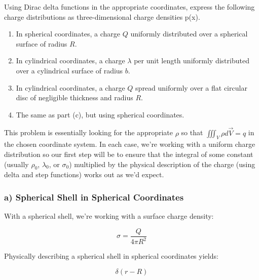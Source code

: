 \begin{question}
  Using Dirac delta functions in the appropriate coordinates, express
  the following charge distributions as three-dimensional charge
  densities p(x).

  \begin{enumerate}[label=(\alph*)]

    \item In spherical coordinates, a charge $Q$ uniformly distributed
      over a spherical surface of radius $R$.

    \item In cylindrical coordinates, a charge $\lambda$ per unit
      length uniformly distributed over a cylindrical surface of
      radius $b$.

    \item In cylindrical coordinates, a charge $Q$ spread uniformly
      over a flat circular disc of negligible thickness and radius
      $R$.

    \item The same as part (c), but using spherical coordinates.
  \end{enumerate}

\end{question}


This problem is essentially looking for the appropriate $\rho$ so that
$\iiint_V \rho d\vec{V} = q$ in the chosen coordinate system.  In each
case, we're working with a uniform charge distribution so our first
step will be to ensure that the integral of some constant (usually
$\rho_0$, $\lambda_0$, or $\sigma_0$) multiplied by the physical
description of the charge (using delta and step functions) works out
as we'd expect.


\subsubsection*{a) Spherical Shell in Spherical Coordinates}

With a spherical shell, we're working with a surface charge density:

\begin{equation}
  \sigma = \frac{Q}{4\pi{}R^2}
\end{equation}

Physically describing a spherical shell in spherical coordinates yields:

\begin{equation}
  \delta(r-R)
\end{equation}

